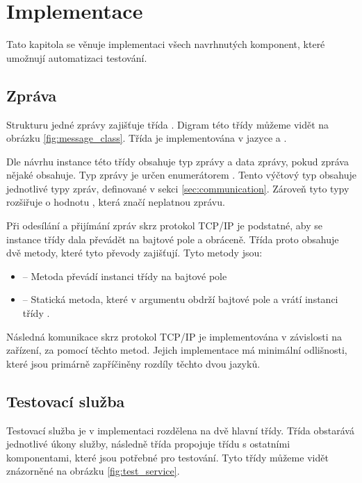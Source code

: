\chapter{Implementace}\label{chap:implementation}

Tato kapitola se věnuje implementaci všech navrhnutých komponent, které umožnují automatizaci testování.

\section{Zpráva}
Strukturu jedné zprávy zajišťuje třída . Digram této třídy můžeme vidět na obrázku \ref{fig:message_class}. Třída  je implementována v jazyce \csharp{} a \cpp{}.

Dle návrhu instance této třídy obsahuje typ zprávy a data zprávy, pokud zpráva nějaké obsahuje. Typ zprávy je určen enumerátorem . Tento výčtový typ obsahuje jednotlivé typy zpráv, definované v sekci \ref{sec:communication}. Zároveň tyto typy rozšiřuje o hodnotu , která značí neplatnou zprávu.

Při odesílání a přijímání zpráv skrz protokol TCP/IP je podstatné, aby se instance třídy dala převádět na bajtové pole a obráceně. Třída  proto obsahuje dvě metody, které tyto převody zajišťují. Tyto metody jsou:

\begin{itemize}
    \item {} -- Metoda převádí instanci třídy  na bajtové pole
    \item {} -- Statická metoda, které v argumentu obdrží bajtové pole a vrátí instanci třídy .
\end{itemize}

Následná komunikace skrz protokol TCP/IP je implementována v závislosti na zařízení, za pomocí těchto metod. Jejich implementace má minimální odlišnosti, které jsou primárně zapříčiněny rozdíly těchto dvou jazyků.

\section{Testovací služba}
Testovací služba je v implementaci rozdělena na dvě hlavní třídy. Třída  obstarává jednotlivé úkony služby, následně třída  propojuje třídu  s ostatními komponentami, které jsou potřebné pro testování. Tyto třídy můžeme vidět znázorněné na obrázku \ref{fig:test_service}.

